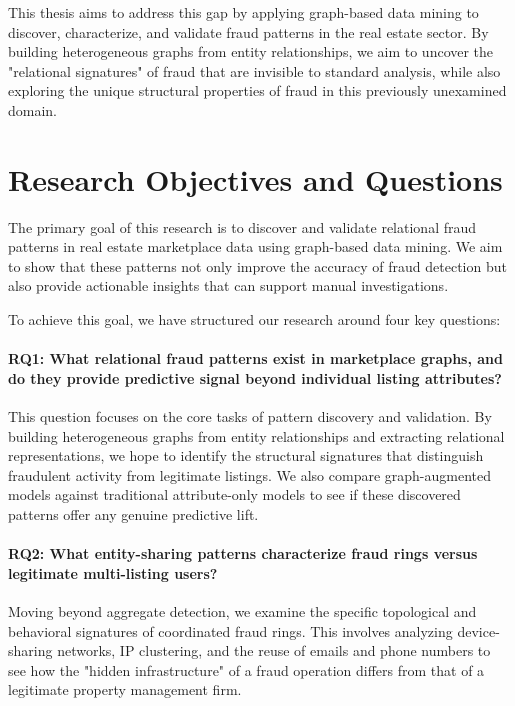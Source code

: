 This thesis aims to address this gap by applying graph-based data mining to discover, characterize, and validate fraud patterns in the real estate sector. By building heterogeneous graphs from entity relationships, we aim to uncover the "relational signatures" of fraud that are invisible to standard analysis, while also exploring the unique structural properties of fraud in this previously unexamined domain.

\section{Research Objectives and Questions}
\label{sec:1_2}

The primary goal of this research is to discover and validate relational fraud patterns in real estate marketplace data using graph-based data mining. We aim to show that these patterns not only improve the accuracy of fraud detection but also provide actionable insights that can support manual investigations.

To achieve this goal, we have structured our research around four key questions:

\paragraph{RQ1: What relational fraud patterns exist in marketplace graphs, and do they provide predictive signal beyond individual listing attributes?}
This question focuses on the core tasks of pattern discovery and validation. By building heterogeneous graphs from entity relationships and extracting relational representations, we hope to identify the structural signatures that distinguish fraudulent activity from legitimate listings. We also compare graph-augmented models against traditional attribute-only models to see if these discovered patterns offer any genuine predictive lift.

\paragraph{RQ2: What entity-sharing patterns characterize fraud rings versus legitimate multi-listing users?}
Moving beyond aggregate detection, we examine the specific topological and behavioral signatures of coordinated fraud rings. This involves analyzing device-sharing networks, IP clustering, and the reuse of emails and phone numbers to see how the "hidden infrastructure" of a fraud operation differs from that of a legitimate property management firm.

